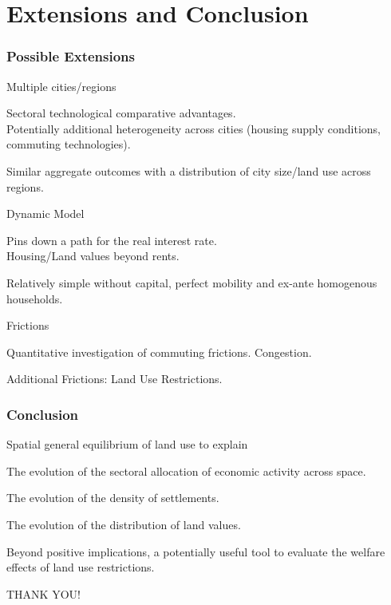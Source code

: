 \documentclass[aspectratio=169]{beamer}
\begin{document}
\section{Extensions and Conclusion}
\begin{frame}
\frametitle{Possible Extensions}
\bi
\item Multiple cities/regions
\bi\item Sectoral technological comparative advantages.\\ Potentially additional heterogeneity across cities (housing supply conditions, commuting technologies).
\item Similar aggregate outcomes with a distribution of city size/land use across regions.\ei
\bigskip
\item Dynamic Model
\bi\item Pins down a path for the real interest rate.\\
Housing/Land values beyond rents.
\item Relatively simple without capital, perfect mobility and ex-ante homogenous households.\ei
\bigskip
\item Frictions
\bi \item Quantitative investigation of commuting frictions. Congestion.
\item Additional Frictions: Land Use Restrictions. 
\ei
\ei
\end{frame}

\begin{frame}
\frametitle{Conclusion}

\bi
\item Spatial general equilibrium of land use to explain
\smallskip

\bi\item The evolution of the sectoral allocation of economic activity across space.
\smallskip
\item The evolution of the density of settlements.
\smallskip
\item The evolution of the distribution of land values.
\ei
\bigskip
\item Beyond positive implications, a potentially useful tool to evaluate the welfare effects of land use restrictions.\ei

\bigskip
\begin{center}
  THANK YOU!
\end{center}
\end{frame}

\beginbackup

\end{document}
